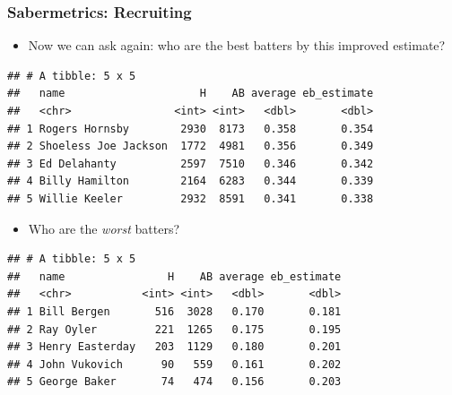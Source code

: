 \documentclass[
  shownotes,
  xcolor={svgnames},
  hyperref={colorlinks,citecolor=DarkBlue,linkcolor=DarkRed,urlcolor=DarkBlue}
  , aspectratio=169]{beamer}
\begin{document}
\begin{frame}[fragile]
\frametitle{Sabermetrics: Recruiting}

\begin{itemize}
  \item Now we can ask again: who are the best batters by this improved estimate?
\end{itemize}


\begin{footnotesize}
\begin{verbatim}
## # A tibble: 5 x 5
##   name                     H    AB average eb_estimate
##   <chr>                <int> <int>   <dbl>       <dbl>
## 1 Rogers Hornsby        2930  8173   0.358       0.354
## 2 Shoeless Joe Jackson  1772  4981   0.356       0.349
## 3 Ed Delahanty          2597  7510   0.346       0.342
## 4 Billy Hamilton        2164  6283   0.344       0.339
## 5 Willie Keeler         2932  8591   0.341       0.338
\end{verbatim}
\end{footnotesize}

\begin{itemize}
\item Who are the \emph{worst} batters?
\end{itemize}
\begin{footnotesize}
\begin{verbatim}
## # A tibble: 5 x 5
##   name                H    AB average eb_estimate
##   <chr>           <int> <int>   <dbl>       <dbl>
## 1 Bill Bergen       516  3028   0.170       0.181
## 2 Ray Oyler         221  1265   0.175       0.195
## 3 Henry Easterday   203  1129   0.180       0.201
## 4 John Vukovich      90   559   0.161       0.202
## 5 George Baker       74   474   0.156       0.203
\end{verbatim}
\end{footnotesize}

\end{frame}
\end{document}
